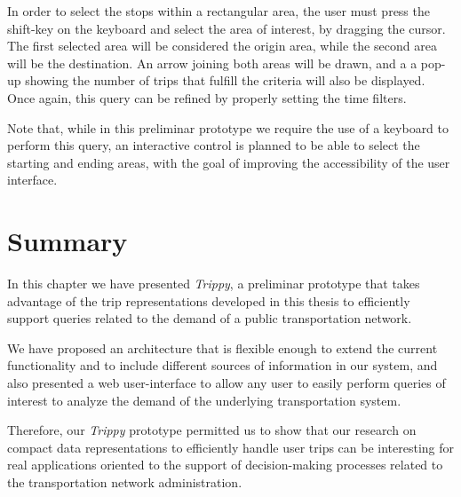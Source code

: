 	\medskip
	In order to select the stops within a rectangular area, the user must press the  {\sc shift-key} on the keyboard and select the area of interest, by dragging the cursor. The first selected area will be considered the origin area, while the second area will be the destination. An arrow joining both areas will be drawn, and a a pop-up showing the number of trips that fulfill the criteria will also be displayed. Once again, this query can be refined by properly setting the time filters.
	
	Note that, while in this preliminar prototype we require the use of a keyboard to perform this query, an interactive control is planned to be able to select the starting and ending areas, with the goal of improving the accessibility of the user interface.
	
	\section{Summary}
	\label{sec:gis:final}
	In this chapter we have presented {\em Trippy}, a preliminar prototype that takes advantage of the trip representations developed in this thesis to efficiently support queries related to the demand of a public transportation network.
	
	We have proposed an architecture that is flexible enough to extend the current functionality and to include different sources of information in our system, and also presented a web \mbox{user-interface} to allow any user to easily perform queries of interest to analyze the demand of the underlying transportation system.
	
	Therefore, our {\em Trippy} prototype permitted us to show that our research on compact data representations to efficiently handle user trips can be interesting for real applications oriented to the support of \mbox{decision-making} processes related to the transportation network administration.
	
